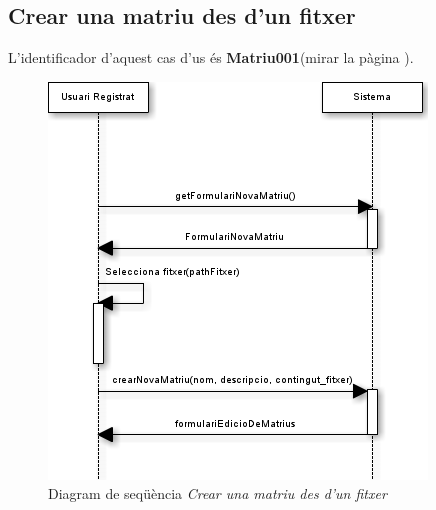 \subsection*{Crear una matriu des d'un fitxer}
L'identificador d'aquest cas d'us \'{e}s \textbf{Matriu001}(mirar la p\`{a}gina \pageref{matriu001}).
\begin{figure}[H]
  \centering
  \includegraphics[scale=0.6]{img/specification/SequenceCreateMatrix.png}
  \caption{Diagram de seqüència \textit{Crear una matriu des d'un fitxer}}
  \label{fig:sequencenewmatrixfromfile}
\end{figure}

